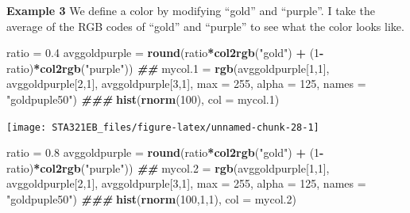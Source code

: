 \documentclass[
]{book}
\newenvironment{Shaded}{\begin{snugshade}}{\end{snugshade}}
\newcommand{\AttributeTok}[1]{\textcolor[rgb]{0.13,0.29,0.53}{#1}}
\newcommand{\DecValTok}[1]{\textcolor[rgb]{0.00,0.00,0.81}{#1}}
\newcommand{\DocumentationTok}[1]{\textcolor[rgb]{0.56,0.35,0.01}{\textbf{\textit{#1}}}}
\newcommand{\FloatTok}[1]{\textcolor[rgb]{0.00,0.00,0.81}{#1}}
\newcommand{\FunctionTok}[1]{\textcolor[rgb]{0.13,0.29,0.53}{\textbf{#1}}}
\newcommand{\NormalTok}[1]{#1}
\newcommand{\OtherTok}[1]{\textcolor[rgb]{0.56,0.35,0.01}{#1}}
\newcommand{\SpecialCharTok}[1]{\textcolor[rgb]{0.81,0.36,0.00}{\textbf{#1}}}
\newcommand{\StringTok}[1]{\textcolor[rgb]{0.31,0.60,0.02}{#1}}
\begin{document}
\textbf{Example 3} We define a color by modifying ``gold'' and ``purple''. I take the average of the RGB codes of ``gold'' and ``purple'' to see what the color looks like.

\begin{Shaded}
\begin{Highlighting}[]
\NormalTok{ratio }\OtherTok{=} \FloatTok{0.4}
\NormalTok{avggoldpurple }\OtherTok{=} \FunctionTok{round}\NormalTok{(ratio}\SpecialCharTok{*}\FunctionTok{col2rgb}\NormalTok{(}\StringTok{"gold"}\NormalTok{) }\SpecialCharTok{+}\NormalTok{ (}\DecValTok{1}\SpecialCharTok{{-}}\NormalTok{ratio)}\SpecialCharTok{*}\FunctionTok{col2rgb}\NormalTok{(}\StringTok{"purple"}\NormalTok{))}
\DocumentationTok{\#\#}
\NormalTok{mycol}\FloatTok{.1} \OtherTok{=} \FunctionTok{rgb}\NormalTok{(avggoldpurple[}\DecValTok{1}\NormalTok{,}\DecValTok{1}\NormalTok{], avggoldpurple[}\DecValTok{2}\NormalTok{,}\DecValTok{1}\NormalTok{], avggoldpurple[}\DecValTok{3}\NormalTok{,}\DecValTok{1}\NormalTok{], }\AttributeTok{max =} \DecValTok{255}\NormalTok{, }\AttributeTok{alpha =} \DecValTok{125}\NormalTok{, }\AttributeTok{names =} \StringTok{"goldpuple50"}\NormalTok{)}
\DocumentationTok{\#\#\#}
\FunctionTok{hist}\NormalTok{(}\FunctionTok{rnorm}\NormalTok{(}\DecValTok{100}\NormalTok{),  }\AttributeTok{col =}\NormalTok{ mycol}\FloatTok{.1}\NormalTok{)}
\end{Highlighting}
\end{Shaded}

\begin{center}\texttt{[image: STA321EB\_files/figure-latex/unnamed-chunk-28-1]} \end{center}

\begin{Shaded}
\begin{Highlighting}[]
\NormalTok{ratio }\OtherTok{=} \FloatTok{0.8}
\NormalTok{avggoldpurple }\OtherTok{=} \FunctionTok{round}\NormalTok{(ratio}\SpecialCharTok{*}\FunctionTok{col2rgb}\NormalTok{(}\StringTok{"gold"}\NormalTok{) }\SpecialCharTok{+}\NormalTok{ (}\DecValTok{1}\SpecialCharTok{{-}}\NormalTok{ratio)}\SpecialCharTok{*}\FunctionTok{col2rgb}\NormalTok{(}\StringTok{"purple"}\NormalTok{))}
\DocumentationTok{\#\#}
\NormalTok{mycol}\FloatTok{.2} \OtherTok{=} \FunctionTok{rgb}\NormalTok{(avggoldpurple[}\DecValTok{1}\NormalTok{,}\DecValTok{1}\NormalTok{], avggoldpurple[}\DecValTok{2}\NormalTok{,}\DecValTok{1}\NormalTok{], avggoldpurple[}\DecValTok{3}\NormalTok{,}\DecValTok{1}\NormalTok{], }\AttributeTok{max =} \DecValTok{255}\NormalTok{, }\AttributeTok{alpha =} \DecValTok{125}\NormalTok{, }\AttributeTok{names =} \StringTok{"goldpuple50"}\NormalTok{)}
\DocumentationTok{\#\#\#}
\FunctionTok{hist}\NormalTok{(}\FunctionTok{rnorm}\NormalTok{(}\DecValTok{100}\NormalTok{,}\DecValTok{1}\NormalTok{,}\DecValTok{1}\NormalTok{),  }\AttributeTok{col =}\NormalTok{ mycol}\FloatTok{.2}\NormalTok{)}
\end{Highlighting}
\end{Shaded}
\end{document}
